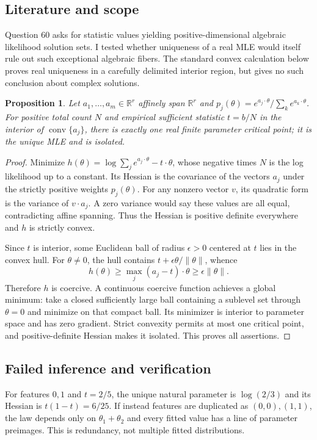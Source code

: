 \documentclass[11pt]{article}
\newtheorem{proposition}{Proposition}
\begin{document}
\subsection{Literature and scope}
Question 60 asks for statistic values yielding positive-dimensional algebraic likelihood solution sets. I tested whether uniqueness of a real MLE would itself rule out such exceptional algebraic fibers. The standard convex calculation below proves real uniqueness in a carefully delimited interior region, but gives no such conclusion about complex solutions.
\begin{proposition}
Let $a_1,\ldots,a_m\in\mathbb R^r$ affinely span $\mathbb R^r$ and $p_j(\theta)=e^{a_j\cdot\theta}/\sum_ke^{a_k\cdot\theta}$. For positive total count $N$ and empirical sufficient statistic $t=b/N$ in the interior of $\operatorname{conv}\{a_j\}$, there is exactly one real finite parameter critical point; it is the unique MLE and is isolated.
\end{proposition}
\begin{proof}
Minimize $h(\theta)=\log\sum_je^{a_j\cdot\theta}-t\cdot\theta$, whose negative times $N$ is the log likelihood up to a constant. Its Hessian is the covariance of the vectors $a_j$ under the strictly positive weights $p_j(\theta)$. For any nonzero vector $v$, its quadratic form is the variance of $v\cdot a_j$. A zero variance would say these values are all equal, contradicting affine spanning. Thus the Hessian is positive definite everywhere and $h$ is strictly convex.

Since $t$ is interior, some Euclidean ball of radius $\epsilon>0$ centered at $t$ lies in the convex hull. For $\theta\ne0$, the hull contains $t+\epsilon\theta/\|\theta\|$, whence
\[
h(\theta)\ge\max_j(a_j-t)\cdot\theta\ge\epsilon\|\theta\|.
\]
Therefore $h$ is coercive. A continuous coercive function achieves a global minimum: take a closed sufficiently large ball containing a sublevel set through $\theta=0$ and minimize on that compact ball. Its minimizer is interior to parameter space and has zero gradient. Strict convexity permits at most one critical point, and positive-definite Hessian makes it isolated. This proves all assertions.
\end{proof}
\subsection{Failed inference and verification}
For features $0,1$ and $t=2/5$, the unique natural parameter is $\log(2/3)$ and its Hessian is $t(1-t)=6/25$. If instead features are duplicated as $(0,0),(1,1)$, the law depends only on $\theta_1+\theta_2$ and every fitted value has a line of parameter preimages. This is redundancy, not multiple fitted distributions.
\end{document}
